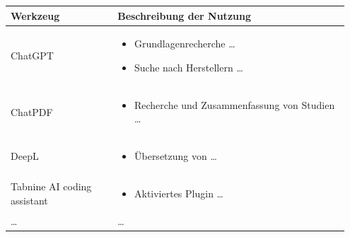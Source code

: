 \documentclass{scrbook} %
\begin{document}
\begin{table}[hbt]
    \centering
    \renewcommand{\arraystretch}{1.5}
    \label{tab:anhang_uebersicht_KI_werkzeuge}
    \begin{tabular}{>{\raggedright\arraybackslash}p{0.3\linewidth}
                    >{\raggedright\arraybackslash}p{0.65\linewidth}}
        \textbf{Werkzeug} & \textbf{Beschreibung der Nutzung}\\
        \hline \hline
        ChatGPT &
        \begin{itemize}[noitemsep,topsep=0pt]
            \item Grundlagenrecherche …
            \item Suche nach Herstellern …
        \end{itemize} \\
        ChatPDF &
        \begin{itemize}[noitemsep,topsep=0pt]
            \item Recherche und Zusammenfassung von Studien …
        \end{itemize} \\
        DeepL &
        \begin{itemize}[noitemsep,topsep=0pt]
            \item Übersetzung von …
        \end{itemize} \\
        Tabnine AI coding assistant &
        \begin{itemize}[noitemsep,topsep=0pt]
            \item Aktiviertes Plugin …
        \end{itemize} \\
        \ldots & \ldots \\
        \hline
    \end{tabular}
\end{table}







\begingroup
\renewcommand{\bibfont}{\fontsize{13pt}{12pt}\selectfont}  %
\sloppy
\printbibliography
\endgroup
\end{document}
